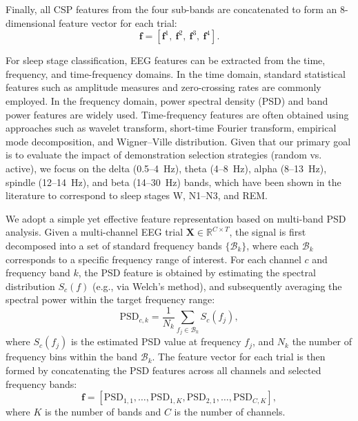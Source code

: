 \documentclass[journal,twocolumn]{IEEEtran}
\begin{document}
Finally, all CSP features from the four sub-bands are concatenated to form an 8-dimensional feature vector for each trial:
\begin{equation}
    \mathbf{f} = [\mathbf{f}^{1},\ \mathbf{f}^{2},\ \mathbf{f}^{3},\ \mathbf{f}^{4}].
    \label{eq:concat_feat}
\end{equation}

For sleep stage classification, EEG features can be extracted from the time, frequency, and time-frequency domains. In the time domain, standard statistical features such as amplitude measures and zero-crossing rates are commonly employed. In the frequency domain, power spectral density (PSD) and band power features are widely used. Time-frequency features are often obtained using approaches such as wavelet transform, short-time Fourier transform, empirical mode decomposition, and Wigner–Ville distribution. Given that our primary goal is to evaluate the impact of demonstration selection strategies (random vs. active), we focus on the delta (0.5--4~Hz), theta (4–8~Hz), alpha (8--13~Hz), spindle (12--14~Hz), and beta (14--30~Hz) bands, which have been shown in the literature to correspond to sleep stages W, N1--N3, and REM.

We adopt a simple yet effective feature representation based on multi-band PSD analysis. Given a multi-channel EEG trial $\mathbf{X} \in \mathbb{R}^{C \times T}$, the signal is first decomposed into a set of standard frequency bands $\{\mathcal{B}_k\}$, where each $\mathcal{B}_k$ corresponds to a specific frequency range of interest. For each channel $c$ and frequency band $k$, the PSD feature is obtained by estimating the spectral distribution $S_c(f)$ (e.g., via Welch's method), and subsequently averaging the spectral power within the target frequency range: 
\begin{equation}
    \mathrm{PSD}_{c,k} = \frac{1}{N_k} \sum_{f_j \in \mathcal{B}_k} S_c(f_j),
    \label{eq:psd_feature}
\end{equation}
where $S_c(f_j)$ is the estimated PSD value at frequency $f_j$, and $N_k$ the number of frequency bins within the band $\mathcal{B}_k$. The feature vector for each trial is then formed by concatenating the PSD features across all channels and selected frequency bands:
\begin{equation}
    \mathbf{f} = [\mathrm{PSD}_{1,1}, \ldots, \mathrm{PSD}_{1,K}, \mathrm{PSD}_{2,1}, \ldots, \mathrm{PSD}_{C,K}],
    \label{eq:feature_vector}
\end{equation}
where $K$ is the number of bands and $C$ is the number of channels.
\end{document}
